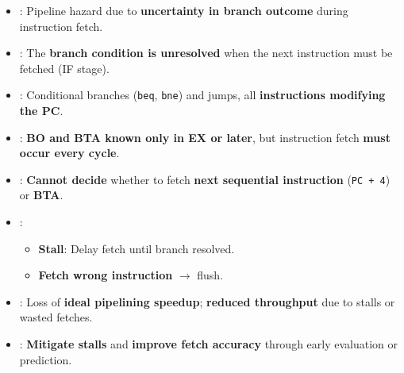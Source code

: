 \highspace
\begin{takeawaysbox}
    \begin{itemize}
        \item {}: Pipeline hazard due to \textbf{uncertainty in branch outcome} during instruction fetch.
        \item {}: The \textbf{branch condition is unresolved} when the next instruction must be fetched (IF stage).
        \item {}: Conditional branches (\texttt{beq}, \texttt{bne}) and jumps, all \textbf{instructions modifying the PC}.
        \item {}: \textbf{BO and BTA known only in EX or later}, but instruction fetch \textbf{must occur every cycle}.
        \item {}: \textbf{Cannot decide} whether to fetch \textbf{next sequential instruction} (\texttt{PC + 4}) or \textbf{BTA}.
        \item {}:
        \begin{itemize}
            \item \textbf{Stall}: Delay fetch until branch resolved.
            \item \textbf{Fetch wrong instruction} $\rightarrow$ flush.
        \end{itemize}
        \item {}: Loss of \textbf{ideal pipelining speedup}; \textbf{reduced throughput} due to stalls or wasted fetches.
        \item {}: \textbf{Mitigate stalls} and \textbf{improve fetch accuracy} through early evaluation or prediction.
    \end{itemize}
\end{takeawaysbox}